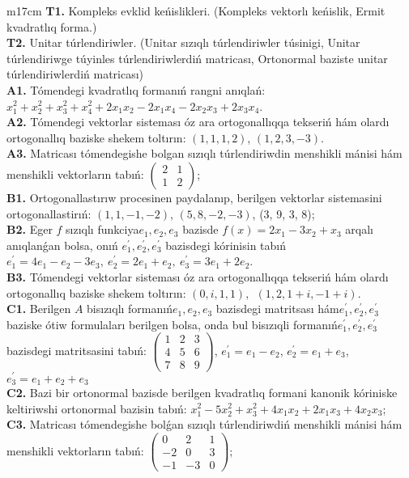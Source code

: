\documentclass{article}
\begin{document}
\begin{tabular}{m{17cm}}
\textbf{T1.} Kompleks evklid keńislikleri.  (Kompleks vektorlı keńislik, Ermit kvadratlıq forma.) \\
\textbf{T2.} Unitar túrlendiriwler. (Unitar sızıqlı túrlendiriwler túsinigi,  Unitar túrlendiriwge túyinles túrlendiriwlerdiń matricası,   Ortonormal baziste unitar túrlendiriwlerdiń matricası) \\
\textbf{A1.} Tómendegi kvadratlıq formanıń rangni anıqlań: \(x_{1}^{2} + x_{2}^{2} + x_{3}^{2} + x_{4}^{2} + 2x_{1}x_{2} - 2x_{1}x_{4} - 2x_{2}x_{3} + 2x_{3}x_{4}\). \\
\textbf{A2.} Tómendegi vektorlar sisteması óz ara ortogonallıqqa tekseriń hám olardı ortogonallıq baziske shekem toltırın: \((1,1,1,2)\), \((1,2,3, - 3)\). \\
\textbf{A3.} Matricası tómendegishe bolgan sızıqlı túrlendiriwdin menshikli mánisi hám menshikli vektorların tabıń: \(\begin{pmatrix} 2 & 1 \\ 1 & 2 \end{pmatrix}\); \\
\textbf{B1.} Ortogonallastırıw procesinen paydalanıp, berilgen vektorlar sistemasini ortogonallastirıń: \((1,1, - 1, - 2)\), \((5,8, - 2, - 3)\), (3, 9, 3, 8); \\
\textbf{B2.} Eger \(f\) sızıqlı funkciya\(e_{1},e_{2},e_{3}\) bazisde \(f(x) = 2x_{1} - 3x_{2} + x_{3}\) arqalı anıqlanǵan bolsa, onıń \(e_{1}^{'},e_{2}^{'},e_{3}^{'}\) bazisdegi kórinisin tabıń\(e_{1}^{'} = 4e_{1} - e_{2} - 3e_{3},\ e_{2}^{'} = 2e_{1} + e_{2},\ e_{3}^{'} = 3e_{1} + 2e_{2}\). \\
\textbf{B3.} Tómendegi vektorlar sisteması óz ara ortogonallıqqa tekseriń hám olardı ortogonallıq baziske shekem toltırın: \((0,i,1,1),\ \ (1,2,1 + i, - 1 + i)\). \\
\textbf{C1.} Berilgen \(A\) bisızıqlı formanıń\(e_{1},e_{2},e_{3}\) bazisdegi matritsası hám\(e_{1}^{'},e_{2}^{'},e_{3}^{'}\) baziske ótiw formulaları berilgen bolsa, onda bul bisızıqli formanıń\(e_{1}^{'},e_{2}^{'},e_{3}^{'}\) bazisdegi matritsasini tabıń: \(\begin{pmatrix} 1 & 2 & 3 \\ 4 & 5 & 6 \\ 7 & 8 & 9 \end{pmatrix}\), \(e_{1}^{'} = e_{1} - e_{2}\), \(e_{2}^{'} = e_{1} + e_{3}\), \(e_{3}^{'} = e_{1} + e_{2} + e_{3}\) \\
\textbf{C2.} Bazi bir ortonormal bazisde berilgen kvadratlıq formani kanonik kóriniske keltiriwshi ortonormal bazisin tabıń: \(x_{1}^{2} - 5x_{2}^{2} + x_{3}^{2} + 4x_{1}x_{2} + 2x_{1}x_{3} + 4x_{2}x_{3}\); \\
\textbf{C3.} Matricası tómendegishe bolǵan sızıqlı túrlendiriwdiń menshikli mánisi hám menshikli vektorların tabıń: \(\begin{pmatrix} 0 & 2 & 1 \\  - 2 & 0 & 3 \\  - 1 & - 3 & 0 \end{pmatrix}\); \\

\end{tabular}
\vspace{1cm}
\end{document}
